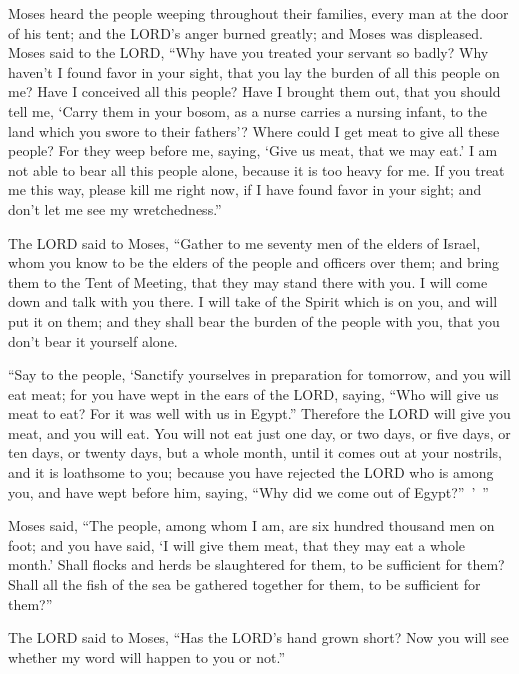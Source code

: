 \myverse{}Moses heard the people weeping throughout their families, every
man at the door of his tent; and the LORD’s anger burned greatly; and Moses was displeased.
\myverse{}Moses said to the LORD, “Why have you treated your servant so badly? Why
haven’t I found favor in your sight, that you lay the burden of all this people on me?
\myverse{}Have I conceived all this people? Have I brought them out, that you should
tell me, ‘Carry them in your bosom, as a nurse carries a nursing infant, to the land which you swore to
their fathers’?
\myverse{}Where could I get meat to give all these people? For they weep before me,
saying, ‘Give us meat, that we may eat.’
\myverse{}I am not able to bear all this people alone, because it is too heavy for
me.
\myverse{}If you treat me this way, please kill me right now, if I have found favor
in your sight; and don’t let me see my wretchedness.”


\myverse{}The LORD said to Moses, “Gather to me seventy men of the elders
of Israel, whom you know to be the elders of the people and officers over them; and bring them to the
Tent of Meeting, that they may stand there with you.
\myverse{}I will come down and talk with you there. I will take of the Spirit which
is on you, and will put it on them; and they shall bear the burden of the people with you, that you don’t
bear it yourself alone.


\myverse{}“Say to the people, ‘Sanctify yourselves in preparation for
tomorrow, and you will eat meat; for you have wept in the ears of the LORD, saying, “Who will give us
meat to eat? For it was well with us in Egypt.” Therefore the LORD will give you meat, and you will eat.
\myverse{}You will not eat just one day, or two days, or five days, or ten days, or
twenty days,
\myverse{}but a whole month, until it comes out at your nostrils, and it is loathsome
to you; because you have rejected the LORD who is among you, and have wept before him, saying, “Why did
we come out of Egypt?” ’ ”


\myverse{}Moses said, “The people, among whom I am, are six hundred thousand
men on foot; and you have said, ‘I will give them meat, that they may eat a whole month.’
\myverse{}Shall flocks and herds be slaughtered for them, to be sufficient for them?
Shall all the fish of the sea be gathered together for them, to be sufficient for them?”


\myverse{}The LORD said to Moses, “Has the LORD’s hand grown short? Now
you will see whether my word will happen to you or not.”


